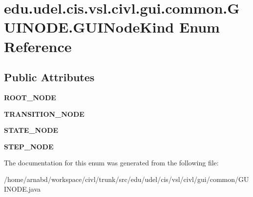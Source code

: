 \hypertarget{enumedu_1_1udel_1_1cis_1_1vsl_1_1civl_1_1gui_1_1common_1_1GUINODE_1_1GUINodeKind}{}\section{edu.\+udel.\+cis.\+vsl.\+civl.\+gui.\+common.\+G\+U\+I\+N\+O\+D\+E.\+G\+U\+I\+Node\+Kind Enum Reference}
\label{enumedu_1_1udel_1_1cis_1_1vsl_1_1civl_1_1gui_1_1common_1_1GUINODE_1_1GUINodeKind}
\subsection*{Public Attributes}
\begin{DoxyCompactItemize}
\item 
\hypertarget{enumedu_1_1udel_1_1cis_1_1vsl_1_1civl_1_1gui_1_1common_1_1GUINODE_1_1GUINodeKind_a31e251a542a8cdc870d73dcd1e4a1b52}{}{\bfseries R\+O\+O\+T\+\_\+\+N\+O\+D\+E}\label{enumedu_1_1udel_1_1cis_1_1vsl_1_1civl_1_1gui_1_1common_1_1GUINODE_1_1GUINodeKind_a31e251a542a8cdc870d73dcd1e4a1b52}

\item 
\hypertarget{enumedu_1_1udel_1_1cis_1_1vsl_1_1civl_1_1gui_1_1common_1_1GUINODE_1_1GUINodeKind_a2871c5574c3aa22d3372a961fc999b49}{}{\bfseries T\+R\+A\+N\+S\+I\+T\+I\+O\+N\+\_\+\+N\+O\+D\+E}\label{enumedu_1_1udel_1_1cis_1_1vsl_1_1civl_1_1gui_1_1common_1_1GUINODE_1_1GUINodeKind_a2871c5574c3aa22d3372a961fc999b49}

\item 
\hypertarget{enumedu_1_1udel_1_1cis_1_1vsl_1_1civl_1_1gui_1_1common_1_1GUINODE_1_1GUINodeKind_ad3d9566c12148af4a24b0cc59e21b673}{}{\bfseries S\+T\+A\+T\+E\+\_\+\+N\+O\+D\+E}\label{enumedu_1_1udel_1_1cis_1_1vsl_1_1civl_1_1gui_1_1common_1_1GUINODE_1_1GUINodeKind_ad3d9566c12148af4a24b0cc59e21b673}

\item 
\hypertarget{enumedu_1_1udel_1_1cis_1_1vsl_1_1civl_1_1gui_1_1common_1_1GUINODE_1_1GUINodeKind_afdf49efa0c71a46eb75e9f0e93b49daf}{}{\bfseries S\+T\+E\+P\+\_\+\+N\+O\+D\+E}\label{enumedu_1_1udel_1_1cis_1_1vsl_1_1civl_1_1gui_1_1common_1_1GUINODE_1_1GUINodeKind_afdf49efa0c71a46eb75e9f0e93b49daf}

\end{DoxyCompactItemize}


The documentation for this enum was generated from the following file\+:\begin{DoxyCompactItemize}
\item 
/home/arnabd/workspace/civl/trunk/src/edu/udel/cis/vsl/civl/gui/common/G\+U\+I\+N\+O\+D\+E.\+java\end{DoxyCompactItemize}
